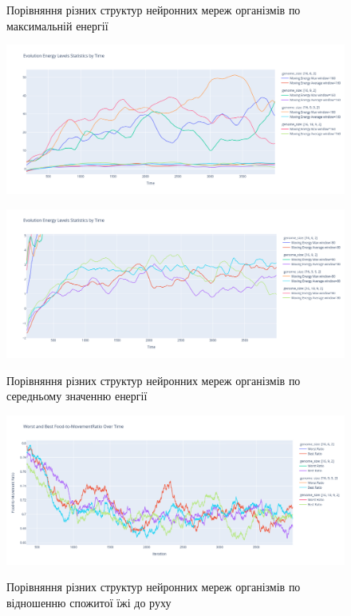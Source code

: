 \begin{figure}[ht]
  \centering
  \caption{Порівняння різних структур нейронних мереж організмів по максимальній енергії}
  \includegraphics[scale=0.3]{Images/comparing-genomes-at-max-energy.png}
  \label{fig:порівняння-різних-структур-нейронних-мереж-організмів-по-амксимальній-енергії}

  \caption{Порівняння різних структур нейронних мереж організмів по середньому значенню енергії}
  \includegraphics[scale=0.3]{Images/comparing-genomes-at-avg-energy.png}
  \label{fig:порівняння-різних-структур-нейронних-мереж-організмів-по-середньому-значенню-енергії}
\end{figure}

\begin{figure}[ht]
  \centering
  \caption{Порівняння різних структур нейронних мереж організмів по відношенню спожитої їжі до руху}
  \includegraphics[scale=0.3]{Images/comparing-genomes-at-food-to-movement.png}
  \label{fig:порівняння-різних-структур-нейронних-мереж-організмів-по-відношенню-спожитої-їжі-до-руху}
\end{figure}

